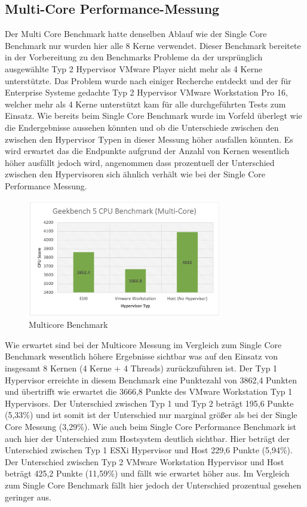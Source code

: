\documentclass[conference]{IEEEtran}
\begin{document}
\subsection{Multi-Core Performance-Messung}
Der Multi Core Benchmark hatte denselben Ablauf wie der Single Core Benchmark nur wurden hier alle 8 Kerne verwendet. Dieser Benchmark bereitete in der Vorbereitung zu den Benchmarks Probleme da der ursprünglich ausgewählte Typ 2 Hypervisor VMware Player nicht mehr als 4 Kerne unterstützte. Das Problem wurde nach einiger Recherche entdeckt und der für Enterprise Systeme gedachte Typ 2 Hypervisor VMware Workstation Pro 16, welcher mehr als 4 Kerne unterstützt kam für alle durchgeführten Tests zum Einsatz.
Wie bereits beim Single Core Benchmark wurde im Vorfeld überlegt wie die Endergebnisse aussehen könnten und ob die Unterschiede zwischen den zwischen den Hypervisor Typen in dieser Messung höher ausfallen könnten. Es wird erwartet das die Endpunkte aufgrund der Anzahl von Kernen wesentlich höher ausfällt jedoch wird, angenommen dass prozentuell der Unterschied zwischen den Hypervisoren sich ähnlich verhält wie bei der Single Core Performance Messung. \newline

\begin{figure}[!h]
	\centering
	\includegraphics[keepaspectratio,width=8.5cm,height=0.75\textheight]{multicore.png}
	\caption{Multicore Benchmark}
	\label{multicore}
\end{figure}

Wie erwartet sind bei der Multicore Messung im Vergleich zum Single Core Benchmark wesentlich höhere Ergebnisse sichtbar was auf den Einsatz von insgesamt 8 Kernen (4 Kerne + 4 Threads) zurückzuführen ist. Der Typ 1 Hypervisor erreichte in diesem Benchmark eine Punktezahl von 3862,4 Punkten und übertrifft wie erwartet die 3666,8 Punkte des VMware Workstation Typ 1 Hypervisors. Der Unterschied zwischen Typ 1 und Typ 2 beträgt 195,6 Punkte (5,33\%) und ist somit ist der Unterschied nur marginal größer als bei der Single Core Messung (3,29\%). Wie auch beim Single Core Performance Benchmark ist auch hier der Unterschied zum Hostsystem deutlich sichtbar. Hier beträgt der Unterschied zwischen Typ 1 ESXi Hypervisor und Host 229,6 Punkte (5,94\%). Der Unterschied zwischen Typ 2 VMware Workstation Hypervisor und Host beträgt 425,2 Punkte (11,59\%) und fällt wie erwartet höher aus. Im Vergleich zum Single Core Benchmark fällt hier jedoch der Unterschied prozentual gesehen geringer aus.
\end{document}
